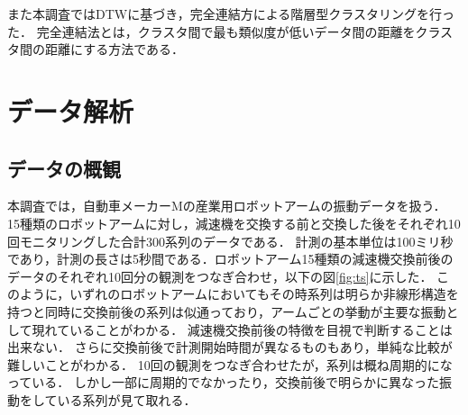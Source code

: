 \documentclass{jarticle}
\begin{document}
また本調査ではDTWに基づき，完全連結方による階層型クラスタリングを行った．
完全連結法とは，クラスタ間で最も類似度が低いデータ間の距離をクラスタ間の距離にする方法である．







\section{データ解析}

\subsection{データの概観}
本調査では，自動車メーカーMの産業用ロボットアームの振動データを扱う．
15種類のロボットアームに対し，減速機を交換する前と交換した後をそれぞれ10回モニタリングした合計300系列のデータである．
計測の基本単位は100ミリ秒であり，計測の長さは5秒間である．ロボットアーム15種類の減速機交換前後のデータのそれぞれ10回分の観測をつなぎ合わせ，以下の図\ref{fig:ts}に示した．
このように，いずれのロボットアームにおいてもその時系列は明らか非線形構造を持つと同時に交換前後の系列は似通っており，アームごとの挙動が主要な振動として現れていることがわかる．
減速機交換前後の特徴を目視で判断することは出来ない．
さらに交換前後で計測開始時間が異なるものもあり，単純な比較が難しいことがわかる．
10回の観測をつなぎ合わせたが，系列は概ね周期的になっている．
しかし一部に周期的でなかったり，交換前後で明らかに異なった振動をしている系列が見て取れる．
\end{document}
